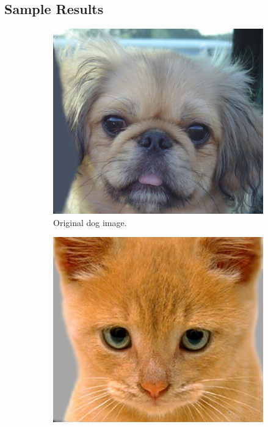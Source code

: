 \documentclass{article}
\begin{document}
\subsection{Sample Results}
\begin{figure}[!htb]
\begin{subfigure}{.35\textwidth}
  \centering
  \includegraphics[width=1\textwidth]{dog.jpg}
  \caption{Original dog image.}
\end{subfigure}%
\begin{subfigure}{.35\textwidth}
  \centering
  \includegraphics[width=1\textwidth]{cat.jpg}

\end{subfigure}
\end{figure}
\end{document}
